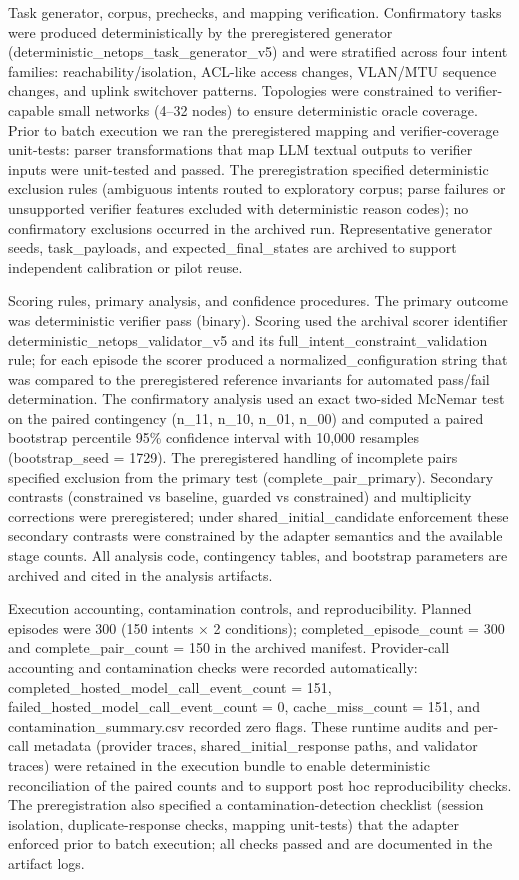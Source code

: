 \documentclass[conference]{IEEEtran}
\begin{document}
Task generator, corpus, prechecks, and mapping verification. Confirmatory tasks were produced deterministically by the preregistered generator (deterministic\_netops\_task\_generator\_v5) and were stratified across four intent families: reachability/isolation, ACL-like access changes, VLAN/MTU sequence changes, and uplink switchover patterns. Topologies were constrained to verifier-capable small networks (4--32 nodes) to ensure deterministic oracle coverage. Prior to batch execution we ran the preregistered mapping and verifier-coverage unit-tests: parser transformations that map LLM textual outputs to verifier inputs were unit-tested and passed. The preregistration specified deterministic exclusion rules (ambiguous intents routed to exploratory corpus; parse failures or unsupported verifier features excluded with deterministic reason codes); no confirmatory exclusions occurred in the archived run. Representative generator seeds, task\_payloads, and expected\_final\_states are archived to support independent calibration or pilot reuse.

Scoring rules, primary analysis, and confidence procedures. The primary outcome was deterministic verifier pass (binary). Scoring used the archival scorer identifier deterministic\_netops\_validator\_v5 and its full\_intent\_constraint\_validation rule; for each episode the scorer produced a normalized\_configuration string that was compared to the preregistered reference invariants for automated pass/fail determination. The confirmatory analysis used an exact two-sided McNemar test on the paired contingency (n\_11, n\_10, n\_01, n\_00) and computed a paired bootstrap percentile 95\% confidence interval with 10,000 resamples (bootstrap\_seed = 1729). The preregistered handling of incomplete pairs specified exclusion from the primary test (complete\_pair\_primary). Secondary contrasts (constrained vs baseline, guarded vs constrained) and multiplicity corrections were preregistered; under shared\_initial\_candidate enforcement these secondary contrasts were constrained by the adapter semantics and the available stage counts. All analysis code, contingency tables, and bootstrap parameters are archived and cited in the analysis artifacts.

Execution accounting, contamination controls, and reproducibility. Planned episodes were 300 (150 intents \ensuremath{\times} 2 conditions); completed\_episode\_count = 300 and complete\_pair\_count = 150 in the archived manifest. Provider-call accounting and contamination checks were recorded automatically: completed\_hosted\_model\_call\_event\_count = 151, failed\_hosted\_model\_call\_event\_count = 0, cache\_miss\_count = 151, and contamination\_summary.csv recorded zero flags. These runtime audits and per-call metadata (provider traces, shared\_initial\_response paths, and validator traces) were retained in the execution bundle to enable deterministic reconciliation of the paired counts and to support post hoc reproducibility checks. The preregistration also specified a contamination-detection checklist (session isolation, duplicate-response checks, mapping unit-tests) that the adapter enforced prior to batch execution; all checks passed and are documented in the artifact logs.
\end{document}
